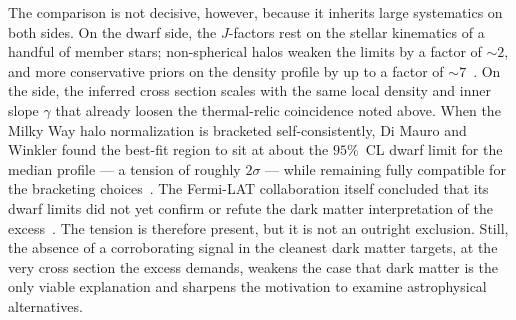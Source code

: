 The comparison is not decisive, however, because it inherits large systematics on both sides.
On the dwarf side, the $J$-factors rest on the stellar kinematics of a handful of member stars; non-spherical halos weaken the limits by a factor of $\sim 2$, and more conservative priors on the density profile by up to a factor of $\sim 7$~\cite{Murgia:2020dzu}.
On the \GCE side, the inferred cross section scales with the same local density and inner slope $\gamma$ that already loosen the thermal-relic coincidence noted above.
When the Milky Way halo normalization is bracketed self-consistently, Di Mauro and Winkler found the \GCE best-fit region to sit at about the $95\%$~CL dwarf limit for the median profile --- a tension of roughly $2\sigma$ --- while remaining fully compatible for the bracketing choices~\cite{DiMauro:2021qcf}.
The Fermi-LAT collaboration itself concluded that its dwarf limits did not yet confirm or refute the dark matter interpretation of the excess~\cite{Fermi-LAT:2016uux}.
The tension is therefore present, but it is not an outright exclusion.
Still, the absence of a corroborating signal in the cleanest dark matter targets, at the very cross section the excess demands, weakens the case that dark matter is the only viable explanation and sharpens the motivation to examine astrophysical alternatives.
